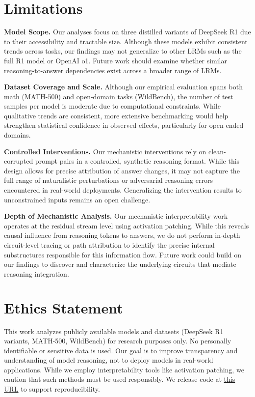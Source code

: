 \documentclass[11pt]{article}
\begin{document}
\section*{Limitations}

\noindent \textbf{Model Scope.} Our analyses focus on three distilled variants of DeepSeek R1 due to their accessibility and tractable size. Although these models exhibit consistent trends across tasks, our findings may not generalize to other LRMs such as the full R1 model or OpenAI o1. Future work should examine whether similar reasoning-to-answer dependencies exist across a broader range of LRMs.

\noindent \textbf{Dataset Coverage and Scale.} Although our empirical evaluation spans both math (MATH-500) and open-domain tasks (WildBench), the number of test samples per model is moderate due to computational constraints. While qualitative trends are consistent, more extensive benchmarking would help strengthen statistical confidence in observed effects, particularly for open-ended domains.

\noindent \textbf{Controlled Interventions.} Our mechanistic interventions rely on clean-corrupted prompt pairs in a controlled, synthetic reasoning format. While this design allows for precise attribution of answer changes, it may not capture the full range of naturalistic perturbations or adversarial reasoning errors encountered in real-world deployments. Generalizing the intervention results to unconstrained inputs remains an open challenge.

\noindent \textbf{Depth of Mechanistic Analysis.} Our mechanistic interpretability work operates at the residual stream level using activation patching. While this reveals causal influence from reasoning tokens to answers, we do not perform in-depth circuit-level tracing or path attribution to identify the precise internal substructures responsible for this information flow. Future work could build on our findings to discover and characterize the underlying circuits that mediate reasoning integration.

\section*{Ethics Statement}

This work analyzes publicly available models and datasets (DeepSeek R1 variants, MATH-500, WildBench) for research purposes only. No personally identifiable or sensitive data is used. Our goal is to improve transparency and understanding of model reasoning, not to deploy models in real-world applications. While we employ interpretability tools like activation patching, we caution that such methods must be used responsibly. We release code at \href{https://aka.ms/R2A-code}{this URL} to support reproducibility.
\end{document}
